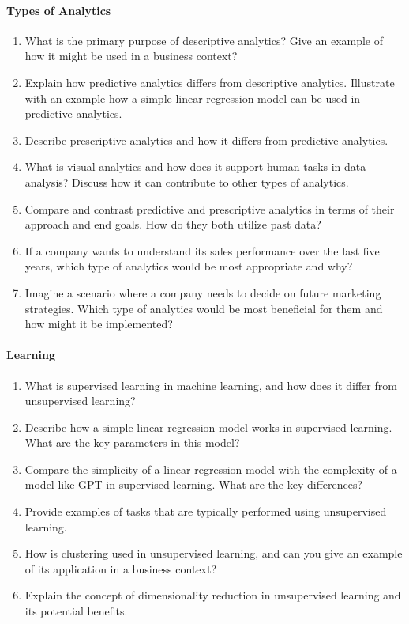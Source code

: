 \paragraph*{Types of Analytics}
\begin{enumerate}
	\item What is the primary purpose of descriptive analytics? Give an example of how it might be used in a business context?
	\item Explain how predictive analytics differs from descriptive analytics. Illustrate with an example how a simple linear regression model can be used in predictive analytics.
    \item Describe prescriptive analytics and how it differs from predictive analytics. 
    \item What is visual analytics and how does it support human tasks in data analysis? Discuss how it can contribute to other types of analytics.
    \item Compare and contrast predictive and prescriptive analytics in terms of their approach and end goals. How do they both utilize past data?
    \item If a company wants to understand its sales performance over the last five years, which type of analytics would be most appropriate and why?
    \item Imagine a scenario where a company needs to decide on future marketing strategies. Which type of analytics would be most beneficial for them and how might it be implemented?
\end{enumerate}
\paragraph*{Learning}
\begin{enumerate}
	\item What is supervised learning in machine learning, and how does it differ from unsupervised learning?
	\item Describe how a simple linear regression model works in supervised learning. What are the key parameters in this model?
    \item Compare the simplicity of a linear regression model with the complexity of a model like GPT in supervised learning. What are the key differences?
    \item Provide examples of tasks that are typically performed using unsupervised learning.
	\item How is clustering used in unsupervised learning, and can you give an example of its application in a business context?
	\item Explain the concept of dimensionality reduction in unsupervised learning and its potential benefits.
\end{enumerate}

